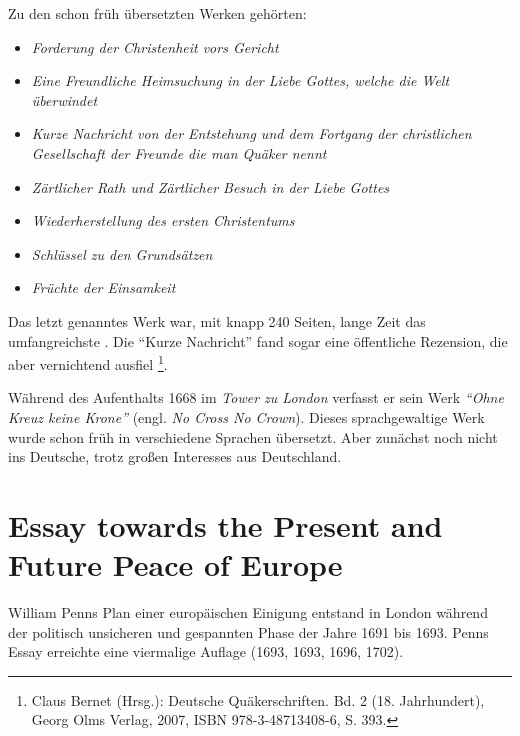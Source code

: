 \medskip

Zu den schon früh übersetzten Werken gehörten:
\begin{itemize}
 \item \textit{Forderung der Christenheit vors Gericht}
 \item \textit{Eine Freundliche Heimsuchung in der Liebe Gottes, welche die Welt
überwindet}
\item \textit{Kurze Nachricht von der Entstehung und dem Fortgang der christlichen
Gesellschaft der Freunde die man Quäker nennt}
\item \textit{Zärtlicher Rath und Zärtlicher Besuch in der Liebe Gottes}
\item \textit{Wiederherstellung des ersten Christentums}
\item \textit{Schlüssel zu den Grundsätzen}
\item \textit{Früchte der Einsamkeit}
\end{itemize}

\medskip

Das letzt genanntes Werk war, mit knapp 240 Seiten, lange Zeit das umfangreichste . Die "`Kurze Nachricht"' fand sogar eine öffentliche Rezension, die aber vernichtend
ausfiel \footnote{Claus Bernet (Hrsg.): Deutsche Quäkerschriften. Bd. 2 (18. Jahrhundert), Georg Olms Verlag, 2007, ISBN 978-3-48713408-6, S. 393.}.

\medskip

Während des Aufenthalts 1668 im \textit{Tower zu London}  verfasst er
sein Werk \textit{"`Ohne Kreuz keine Krone"'} (engl. \textit{No Cross No Crown}).
Dieses sprachgewaltige Werk wurde schon früh in verschiedene Sprachen übersetzt. Aber zunächst noch nicht ins Deutsche, trotz großen Interesses aus
Deutschland.

\section{Essay towards the Present and Future Peace of Europe}


William Penns Plan einer europäischen Einigung entstand in London  während der
politisch unsicheren und gespannten Phase der Jahre 1691 bis 1693. Penns Essay
erreichte eine viermalige Auflage (1693, 1693, 1696, 1702).

\medskip

